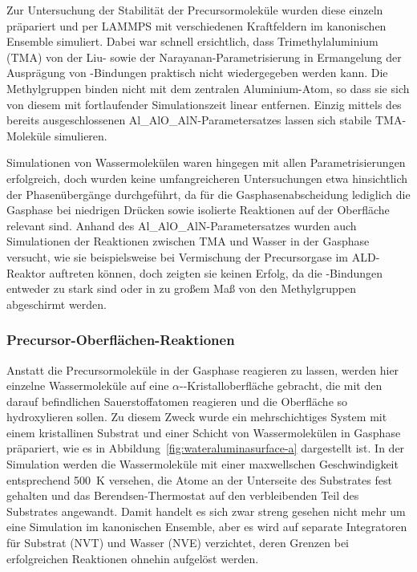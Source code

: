 Zur Untersuchung der Stabilität der Precursormoleküle wurden diese einzeln präpariert und per LAMMPS mit verschiedenen Kraftfeldern im kanonischen Ensemble simuliert.
Dabei war schnell ersichtlich, dass Trimethylaluminium (TMA) von der Liu- sowie der Narayanan-Parametrisierung in Ermangelung der Ausprägung von -Bindungen praktisch nicht wiedergegeben werden kann.
Die Methylgruppen binden nicht mit dem zentralen Aluminium-Atom, so dass sie sich von diesem mit fortlaufender Simulationszeit linear entfernen.
Einzig mittels des bereits ausgeschlossenen Al\_AlO\_AlN-Parametersatzes lassen sich stabile TMA-Moleküle simulieren.


Simulationen von Wassermolekülen waren hingegen mit allen Parametrisierungen erfolgreich, doch wurden keine umfangreicheren Untersuchungen etwa hinsichtlich der Phasenübergänge durchgeführt, da für die Gasphasenabscheidung lediglich die Gasphase bei niedrigen Drücken sowie isolierte Reaktionen auf der Oberfläche relevant sind.
Anhand des Al\_AlO\_AlN-Parametersatzes wurden auch Simulationen der Reaktionen zwischen TMA und Wasser in der Gasphase versucht, wie sie beispielsweise bei Vermischung der Precursorgase im ALD-Reaktor auftreten können, doch zeigten sie keinen Erfolg, da die -Bindungen entweder zu stark sind oder in zu großem Maß von den Methylgruppen abgeschirmt werden.

\subsubsection{Precursor-Oberflächen-Reaktionen}

Anstatt die Precursormoleküle in der Gasphase reagieren zu lassen, werden hier einzelne Wassermoleküle auf eine $\alpha$--Kristalloberfläche gebracht, die mit den darauf befindlichen Sauerstoffatomen reagieren und die Oberfläche so hydroxylieren sollen\cite{shapovalov_ab_2000}.
Zu diesem Zweck wurde ein mehrschichtiges System mit einem kristallinen Substrat und einer Schicht von Wassermolekülen in Gasphase präpariert, wie es in Abbildung~\ref{fig:wateraluminasurface-a} dargestellt ist.
In der Simulation werden die Wassermoleküle mit einer maxwellschen Geschwindigkeit entsprechend \SI{500}{\kelvin} versehen, die Atome an der Unterseite des Substrates fest gehalten und das Berendsen-Thermostat auf den verbleibenden Teil des Substrates angewandt.
Damit handelt es sich zwar streng gesehen nicht mehr um eine Simulation im kanonischen Ensemble, aber es wird auf separate Integratoren für Substrat (NVT) und Wasser (NVE) verzichtet, deren Grenzen bei erfolgreichen Reaktionen ohnehin aufgelöst werden.

